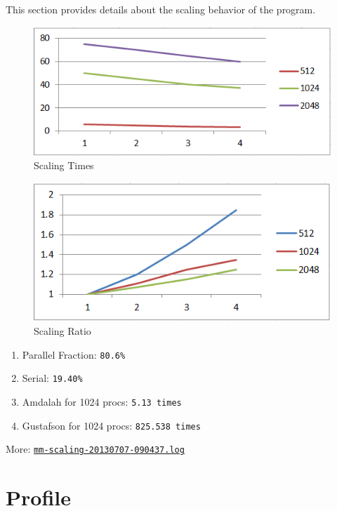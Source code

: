 \documentclass[a4paper]{article}
\begin{document}
This section provides details about the scaling behavior of the program.

\begin{figure}[H]
\label{fig:normal}
\centering
\includegraphics[width=\textwidth]{scaling-time.png}
\caption{Scaling Times}
\end{figure}

\begin{figure}[H]
\label{fig:normal}
\centering
\includegraphics[width=\textwidth]{scaling-ratio.png}
\caption{Scaling Ratio}
\end{figure}

\begin{enumerate}
\item Parallel Fraction: {\tt 80.6\%}
\item Serial: {\tt 19.40\%}
\item Amdalah for 1024 procs: {\tt 5.13 times}
\item Gustafson for 1024 procs: {\tt 825.538 times}
\end{enumerate}

More: \href{TBD}{\tt mm-scaling-20130707-090437.log}

\section{Profile}
\end{document}
